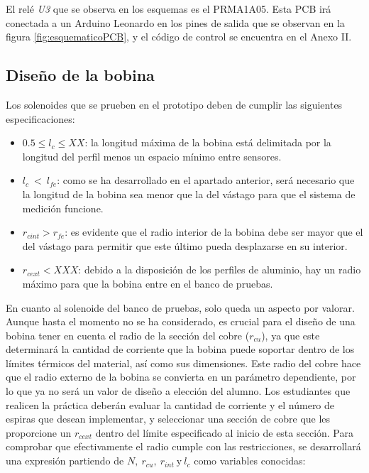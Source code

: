El relé \textit{U3} que se observa en los esquemas es el PRMA1A05. Esta PCB irá conectada a un Arduino Leonardo en los pines de salida que se observan en la figura \ref{fig:esquematicoPCB}, y el código de control se encuentra en el Anexo II.

\subsection{Diseño de la bobina}
\label{subsec:bobina}

Los solenoides que se prueben en el prototipo deben de cumplir las siguientes especificaciones:

\begin{itemize}
    \item \(0.5\leq l_{c} \leq XX\): la longitud máxima de la bobina está delimitada por la longitud del perfil menos un espacio mínimo entre sensores.
    \item \(l_c~<~l_{fe}\): como se ha desarrollado en el apartado anterior, será necesario que la longitud de la bobina sea menor que la del vástago para que el sistema de medición funcione.
    \item \(r_{cint} > r_{fe}\): es evidente que el radio interior de la bobina debe ser mayor que el del vástago para permitir que este último pueda desplazarse en su interior.
    \item \(r_{cext} < XXX\): debido a la disposición de los perfiles de aluminio, hay un radio máximo para que la bobina entre en el banco de pruebas.
\end{itemize}

En cuanto al solenoide del banco de pruebas, solo queda un aspecto por valorar. Aunque hasta el momento no se ha considerado, es crucial para el diseño de una bobina tener en cuenta el radio de la sección del cobre (\(r_{cu}\)), ya que este determinará la cantidad de corriente que la bobina puede soportar dentro de los límites térmicos del material, así como sus dimensiones. Este radio del cobre hace que el radio externo de la bobina se convierta en un parámetro dependiente, por lo que ya no será un valor de diseño a elección del alumno. Los estudiantes que realicen la práctica deberán evaluar la cantidad de corriente y el número de espiras que desean implementar, y seleccionar una sección de cobre que les proporcione un \(r_{cext}\) dentro del límite especificado al inicio de esta sección. Para comprobar que efectivamente el radio cumple con las restricciones, se desarrollará una expresión partiendo de \(N,~r_{cu},~r_{int}~\text{y}~l_c\) como variables conocidas:

